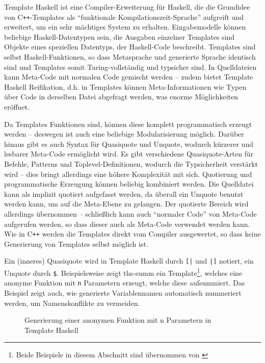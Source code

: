 \documentclass[12pt, a4paper, bibgerm]{scrbook}
\newenvironment{DIFnomarkup}{}{}
\newcommand\icode[1]{\lstinline?#1?}
\newcommand\abb{}
\newcommand{\cpp}{C\texttt{++}}
\begin{document}
Template Haskell ist eine Compiler-Erweiterung für Haskell, die die
Grundidee von \cpp{}-Templates als "`funktionale
Kompilationszeit-Sprache"' aufgreift und erweitert, um ein sehr
mächtiges System zu erhalten. Eingabemodelle können beliebige
Haskell-Datentypen sein, die Ausgaben einzelner Templates sind Objekte
eines speziellen Datentyps, der Haskell-Code beschreibt. Templates sind
selbst Haskell-Funktionen, so dass Metasprache und generierte Sprache
identisch sind und Templates somit Turing-vollständig und typsicher
sind. In Quelldateien kann Meta-Code mit normalen Code gemischt werden
-- zudem bietet Template Haskell Reifikation, d.h. in Templates können
Meta-Informationen wie Typen über Code in derselben Datei abgefragt
werden, was enorme Möglichkeiten eröffnet.

Da Templates Funktionen sind, können diese komplett programmatisch
erzeugt werden -- deswegen ist auch eine beliebige Modularisierung
möglich. Darüber hinaus gibt es auch Syntax für Quasiquote und Unquote,
wodurch kürzerer und lesbarer Meta-Code ermöglicht wird. Es gibt
verschiedene Quasiquote-Arten für Befehle, Patterns und
Toplevel-Definitionen, wodurch die Typsicherheit verstärkt wird -- dies
bringt allerdings eine höhere Komplexität mit sich. Quotierung und
programmatische Erzeugung können beliebig kombiniert werden. Die
Quelldatei kann als implizit quotiert aufgefasst werden, da überall ein
Unquote benutzt werden kann, um auf die Meta-Ebene zu gelangen. Der
quotierte Bereich wird allerdings übernommen -- schließlich kann auch
"`normaler Code"' von Meta-Code aufgerufen werden, so dass dieser auch
als Meta-Code verwendet werden kann. Wie in \cpp{} werden die Templates
direkt vom Compiler ausgewertet, so dass keine Generierung von Templates
selbst möglich ist.

Ein (inneres) Quasiquote wird in Template Haskell durch \icode{[|} und
  \icode{|]} notiert, ein Unquote durch \icode{$}. %
Beispielsweise zeigt \abb{ths-summ} ein Template\footnote{Beide
  Beispiele in diesem Abschnitt sind übernommen von \cite{ThsTutorial}}, welches eine anonyme
Funktion mit \icode{n} Parametern erzeugt, welche diese aufsummiert. Das
Beispiel zeigt auch, wie generierte Variablennamen automatisch
nummeriert werden, um Namenskonflikte zu vermeiden.

\begin{figure}[h]
  \centering
\begin{DIFnomarkup}\end{DIFnomarkup} %
  \caption{Generierung einer anonymen Funktion mit n Parametern in Template Haskell}
  \label{magicl:fig:ths-summ}
\end{figure}
\end{document}

